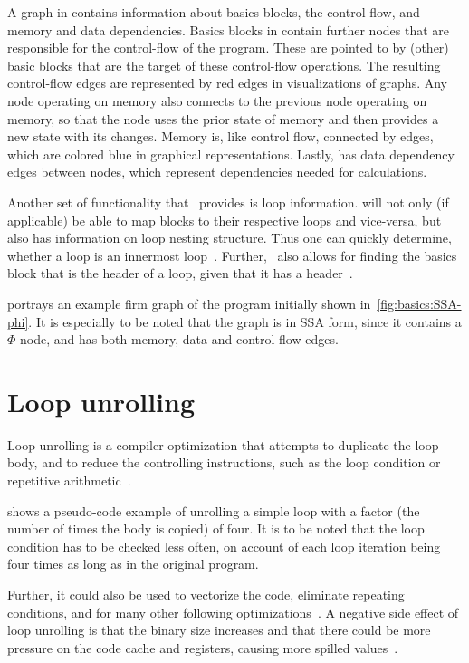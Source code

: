 A graph in \libFIRM{} contains information about basics blocks, the control-flow, and memory and data dependencies.
Basics blocks in \libFIRM{} contain further nodes that are responsible for the control-flow of the program.
These are pointed to by (other) basic blocks that are the target of these control-flow operations.
The resulting control-flow edges are represented by red edges in visualizations of \libFIRM{} graphs.
Any node operating on memory also connects to the previous node operating on memory, so that the node uses the prior state of memory and then provides a new state with its changes.
Memory is, like control flow, connected by edges, which are colored blue in graphical representations.
Lastly, \libFIRM{} has data dependency edges between nodes, which represent dependencies needed for calculations.

Another set of functionality that~\libFIRM{}  provides is loop information.
\libFIRM{} will not only (if applicable) be able to map blocks to their respective loops and vice-versa, but also has information on loop nesting structure.
Thus one can quickly determine, whether a loop is an innermost loop~\cite{libfirm}.
Further,~\libFIRM{} also allows for finding the basics block that is the header of a loop, given that it has a header~\cite{aebi18bachelorarbeit}.

 portrays an example firm graph of the program initially shown in~\cref{fig:basics:SSA-phi}.
It is especially to be noted that the graph is in SSA form, since it contains a $\Phi$-node, and has both memory, data and control-flow edges.


\section{Loop unrolling}\label{sec:basics:unrolling}

Loop unrolling is a compiler optimization that attempts to duplicate the loop body, and to reduce the controlling instructions, such as the loop condition or repetitive arithmetic~\cite{aho_ullman_1979}.

 shows a pseudo-code example of unrolling a simple loop with a factor (the number of times the body is copied) of four.
It is to be noted that the loop condition has to be checked less often, on account of each loop iteration being four times as long as in the original program.

Further, it could also be used to vectorize the code, eliminate repeating conditions, and for many other following optimizations~\cite{fog_2018}.
A negative side effect of loop unrolling is that the binary size increases and that there could be more pressure on the code cache and registers, causing more spilled values~\cite{Sarkar2001}.

